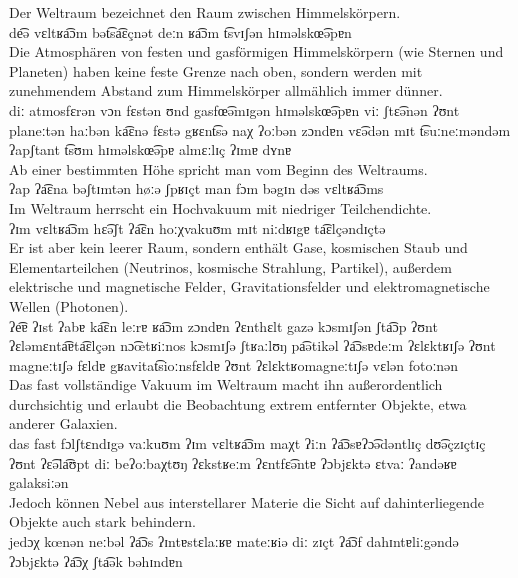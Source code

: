 \begin{exe}
  \ex \gll Der Weltraum bezeichnet den Raum zwischen Himmelskörpern.\\
  de͡ə vɛltʁa͡ɔm bət͡sa͡ɛçnət deːn ʁa͡ɔm t͡svɪʃən hɪməlskœ͡əpɐn\\
  \ex \gll Die Atmosphären von festen und gasförmigen Himmelskörpern (wie Sternen und Planeten) haben keine feste Grenze nach oben, sondern werden mit zunehmendem Abstand zum Himmelskörper allmählich immer dünner.\\
  diː atmosfɛrən vɔn fɛstən ʊnd gasfœ͡əmɪgən hɪməlskœ͡əpɐn viː ʃtɛ͡ənən ʔʊnt planeːtən haːbən ka͡ɛnə fɛstə gʁɛnt͡sə naχ ʔoːbən zɔndɐn vɛ͡ədən mɪt t͡suːneːməndəm ʔapʃtant t͡sʊm hɪməlskœ͡əpɐ almɛːlɪç ʔɪmɐ dʏnɐ\\
  \ex \gll Ab einer bestimmten Höhe spricht man vom Beginn des Weltraums.\\
  ʔap ʔa͡ɛna bəʃtɪmtən høːə ʃpʁɪçt man fɔm bəgɪn dəs vɛltʁa͡ɔms\\
  \ex \gll Im Weltraum herrscht ein Hochvakuum mit niedriger Teilchendichte.\\
  ʔɪm vɛltʁa͡ɔm hɛ͡əʃt ʔa͡ɛn hoːχvakuʊm mɪt niːdʁɪgɐ ta͡ɛlçəndɪçtə\\
  \ex \gll Er ist aber kein leerer Raum, sondern enthält Gase, kosmischen Staub und Elementarteilchen (Neutrinos, kosmische Strahlung, Partikel), außerdem elektrische und magnetische Felder, Gravitationsfelder und elektromagnetische Wellen (Photonen).\\
  ʔe͡ɐ ʔɪst ʔabɐ ka͡ɛn leːrɐ ʁa͡ɔm zɔndɐn ʔɛnthɛlt gazə kɔsmɪʃən ʃta͡ɔp ʔʊnt ʔɛləmɛnta͡ɐta͡ɛlçən nɔ͡œtʁiːnos kɔsmɪʃə ʃtʁaːlʊŋ pa͡ətikəl ʔa͡ɔsɐdeːm ʔɛlɛktʁɪʃə ʔʊnt magneːtɪʃə fɛldɐ gʁavitat͡sioːnsfɛldɐ ʔʊnt ʔɛlɛktʁomagneːtɪʃə vɛlən fotoːnən\\
  \ex \gll Das fast vollständige Vakuum im Weltraum macht ihn außerordentlich durchsichtig und erlaubt die Beobachtung extrem entfernter Objekte, etwa anderer Galaxien.\\
  das fast fɔlʃtɛndɪgə vaːkuʊm ʔɪm vɛltʁa͡ɔm maχt ʔiːn ʔa͡ɔsɐʔɔ͡ədəntlɪç dʊ͡əçzɪçtɪç ʔʊnt ʔɛ͡əla͡ʊpt diː beʔoːbaχtʊŋ ʔɛkstʁeːm ʔɛntfɛ͡əntɐ ʔɔbjɛktə ɛtvaː ʔandəʁɐ galaksiːən\\
  \ex \gll Jedoch können Nebel aus interstellarer Materie die Sicht auf dahinterliegende Objekte auch stark behindern.\\
  jedɔχ kœnən neːbəl ʔa͡ɔs ʔɪntɐstɛlaːʁɐ mateːʁiə diː zɪçt ʔa͡ɔf dahɪntɐliːgəndə ʔɔbjɛktə ʔa͡ɔχ ʃta͡ək bəhɪndɐn\\
\end{exe}
